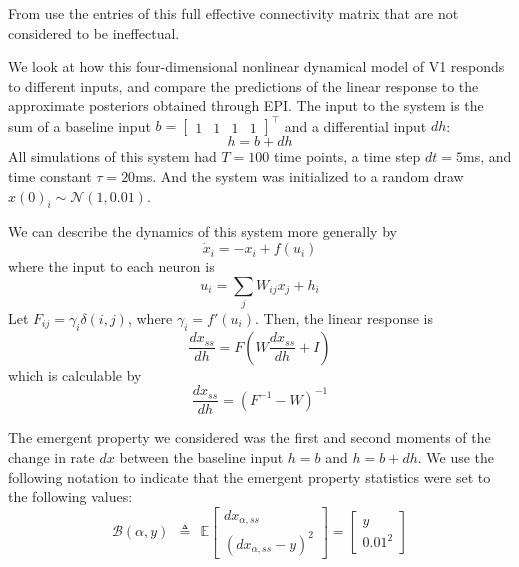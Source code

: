 \documentclass[11pt]{article}
\begin{document}
From use the entries of this full effective connectivity matrix that are not considered to be ineffectual.

We look at how this four-dimensional nonlinear dynamical model of V1 responds to different inputs, and compare the predictions of the linear response to the approximate posteriors obtained through EPI.  The input to the system is the sum of a baseline input $b = \begin{bmatrix} 1 & 1 & 1 & 1 \end{bmatrix}^\top$ and a differential input $dh$:
\begin{equation}
h = b + dh
\end{equation}
All simulations of this system had $T=100$ time points, a time step $dt = 5$ms, and time constant $\tau = 20$ms.  And the system was initialized to a random draw $x(0)_i \sim \mathcal{N}(1, 0.01)$.

We can describe the dynamics of this system more generally by
\begin{equation}
\dot{x}_i = -x_i + f(u_i)
\end{equation}
where the input to each neuron is
\begin{equation}
u_i = \sum_j W_{ij} x_j + h_i
\end{equation}
Let $F_{ij} = \gamma_i \delta(i,j)$, where $\gamma_i = f'(u_i)$.  Then, the linear response is
\begin{equation}
\frac{dx_{ss}}{dh} = F(W\frac{dx_{ss}}{dh} + I)
\end{equation}
which is calculable by
\begin{equation}
\frac{dx_{ss}}{dh} = (F^{-1} - W)^{-1}
\end{equation}

The emergent property we considered was the first and second moments of the change in rate $dx$ between the baseline input $h= b$ and $h = b + dh$.  We use the following notation to indicate that the emergent property statistics were set to the following values:
\begin{equation}
\mathcal{B}(\alpha, y) ~~\triangleq~~ 
\mathbb{E} \begin{bmatrix} dx_{\alpha,ss} \\ (dx_{\alpha,ss} - y)^2 \end{bmatrix} = \begin{bmatrix} y \\ 0.01^2 \end{bmatrix}
\end{equation}
\end{document}
